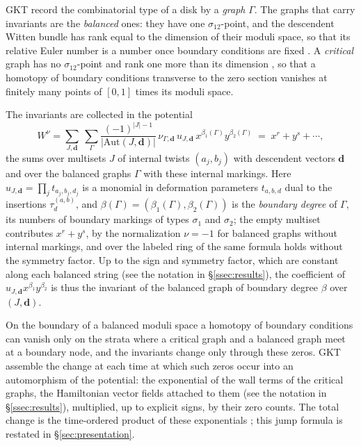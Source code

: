 \documentclass[11pt]{amsart}
\theoremstyle{definition}
\theoremstyle{remark}
\begin{document}
GKT record the combinatorial type of a disk by a \emph{graph} $\Gamma$.  The
graphs that carry invariants are the \emph{balanced} ones: they have
one $\sigma_{12}$-point, and the descendent Witten bundle has rank equal to the
dimension
of their moduli space, so that its relative Euler number is a number once
boundary conditions are fixed \cite[Def.~2.32]{GKT}.  A \emph{critical}
graph has no $\sigma_{12}$-point and rank one more than its dimension
\cite[Def.~2.33]{GKT}, so that a homotopy of boundary conditions transverse to
the zero section vanishes at finitely many points of $[0,1]$ times its moduli
space.

The invariants are collected in the
potential \cite[(4.11)]{GKT}
\[
W^{\nu}=\sum_{J,\mathbf d}\ \sum_{\Gamma}
\frac{(-1)^{|J|-1}}{|\mathrm{Aut}(J,\mathbf d)|}\,
\nu_{\Gamma,\mathbf d}\,u_{J,\mathbf d}\,x^{\beta_1(\Gamma)}y^{\beta_2(\Gamma)}
\;=\;x^{r}+y^{s}+\cdots,
\]
the sums over multisets $J$ of internal twists $(a_j,b_j)$ with descendent
vectors $\mathbf d$ and over the balanced graphs $\Gamma$ with these
internal markings.  Here
$u_{J,\mathbf d}=\prod_{j}t_{a_{j},b_{j},d_{j}}$ is a monomial in deformation
parameters $t_{a,b,d}$ dual to the insertions $\tau_{d}^{(a,b)}$, and
$\beta(\Gamma)=(\beta_1(\Gamma),\beta_2(\Gamma))$ is the \emph{boundary degree} of
$\Gamma$, its numbers of boundary markings of types $\sigma_1$ and $\sigma_2$; the
empty multiset contributes $x^r+y^s$, by the normalization $\nu=-1$ for
balanced graphs without internal markings, and over the labeled ring of
\cite[Def.~4.6]{GKT}
the same formula holds without the symmetry factor.  Up to the sign and
symmetry factor, which are constant along each balanced string (see the notation in
\S\ref{ssec:results}),
the coefficient of $u_{J,\mathbf d}x^{\beta_1}y^{\beta_2}$ is thus the invariant
of the balanced graph of boundary degree $\beta$ over $(J,\mathbf d)$.

On the boundary of a balanced moduli space a homotopy of boundary conditions
can vanish only
on the strata where a critical graph and a balanced graph meet at a boundary
node, and the invariants change only through these zeros.  GKT assemble the
change at each time at which such zeros occur into an automorphism of the
potential: the exponential of the wall terms of the critical graphs, the
Hamiltonian vector fields attached to them (see the notation in
\S\ref{ssec:results}), multiplied, up to explicit signs, by their zero counts.
The total change is the time-ordered product of these exponentials
\cite[proofs of Thms.~5.4 and~5.9]{GKT}; this jump formula is restated in
\S\ref{sec:presentation}.
\end{document}
